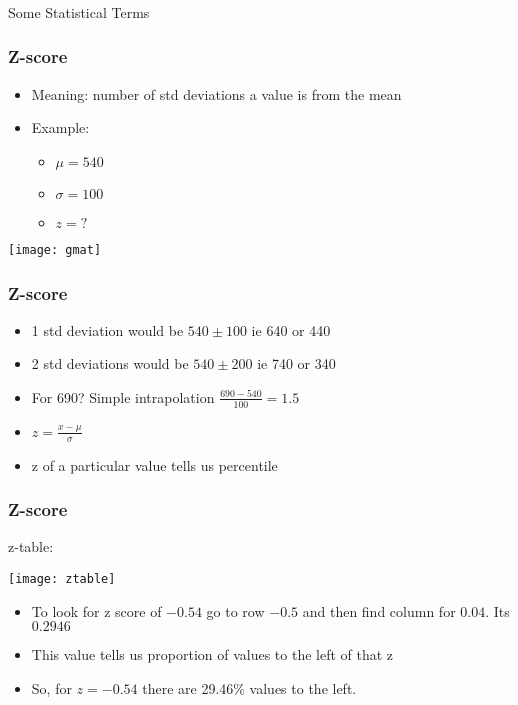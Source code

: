 \begin{frame}[fragile]\frametitle{}

\begin{center}
{\large Some Statistical Terms}
\end{center}
\end{frame}


\begin{frame}[fragile]\frametitle{Z-score}
\begin{itemize}
\item Meaning: number of std deviations a value is from the mean
\item Example:
	\begin{itemize}
	\item $\mu = 540$
	\item $\sigma = 100$
	\item $z = ?$
	\end{itemize}

\end{itemize}
\begin{center}
\texttt{[image: gmat]}
\end{center}
\end{frame}

\begin{frame}[fragile]\frametitle{Z-score}

\begin{itemize}
\item 1 std deviation would be $540 \pm 100$ ie 640 or 440
\item 2 std deviations would be $540 \pm 200$ ie 740 or 340
\item For 690? Simple intrapolation $\frac{690 - 540}{100} = 1.5$
\item $ z = \frac{x - \mu}{\sigma}$
\item z of a particular value tells us percentile
\end{itemize}
\end{frame}

\begin{frame}[fragile]\frametitle{Z-score}
z-table:
\begin{center}
\texttt{[image: ztable]}
\end{center}
\begin{itemize}
\item To look for z score of $-0.54$ go to row $-0.5$ and then find column for $0.04$. Its $0.2946$
\item This value tells us proportion of values to the left of that z
\item So, for $z = -0.54$ there are 29.46\% values to the left.
\end{itemize}
\end{frame}

